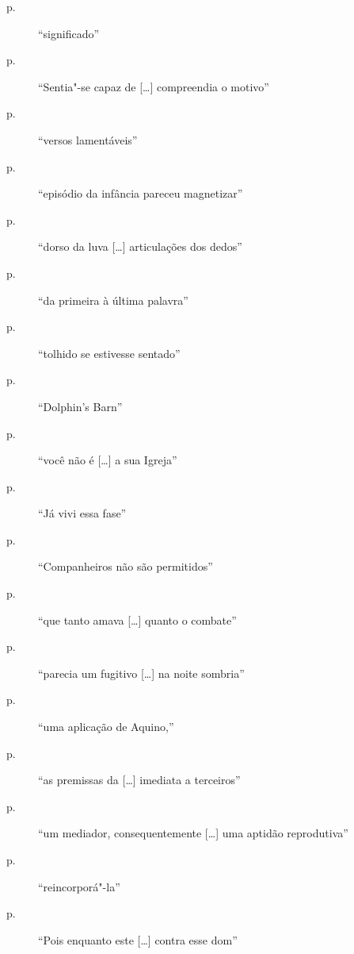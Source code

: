 \begin{description}
\item[p.~\pageref{significado}]  ``significado''

\item[p.~\pageref{sentia"-se"-capaz}]  ``Sentia"-se capaz de [\ldots] compreendia o motivo''

\item[p.~\pageref{versos"-lamentaveis}]  ``versos lamentáveis''

\item[p.~\pageref{episodio"-da}]  ``episódio da infância pareceu magnetizar''

\item[p.~\pageref{dorso"-da}]  ``dorso da luva [\ldots] articulações dos dedos''

\item[p.~\pageref{da"-primeira}]  ``da primeira à última palavra''

\item[p.~\pageref{tolhido"-se}]  ``tolhido se estivesse sentado''

\item[p.~\pageref{dolphin"-s}]  ``Dolphin’s Barn''

\item[p.~\pageref{voce"-nao"-e}]  ``você não é [\ldots] a sua Igreja''

\item[p.~\pageref{ja"-vivi}]  ``Já vivi essa fase''

\item[p.~\pageref{companheiros"-nao}]  ``Companheiros não são permitidos''

\item[p.~\pageref{que"-tanto}]  ``que tanto amava [\ldots] quanto o combate''

\item[p.~\pageref{parecia"-um}]  ``parecia um fugitivo [\ldots] na noite sombria''

\item[p.~\pageref{uma"-aplicacao}]  ``uma aplicação de Aquino,''

\item[p.~\pageref{as"-premissas}]  ``as premissas da [\ldots] imediata a terceiros''

\item[p.~\pageref{um"-mediador}]  ``um mediador, consequentemente [\ldots] uma aptidão reprodutiva''

\item[p.~\pageref{reincorpora"-la}]  ``reincorporá"-la''

\item[p.~\pageref{pois"-enquanto}]  ``Pois enquanto este [\ldots] contra esse dom''


\end{description}
